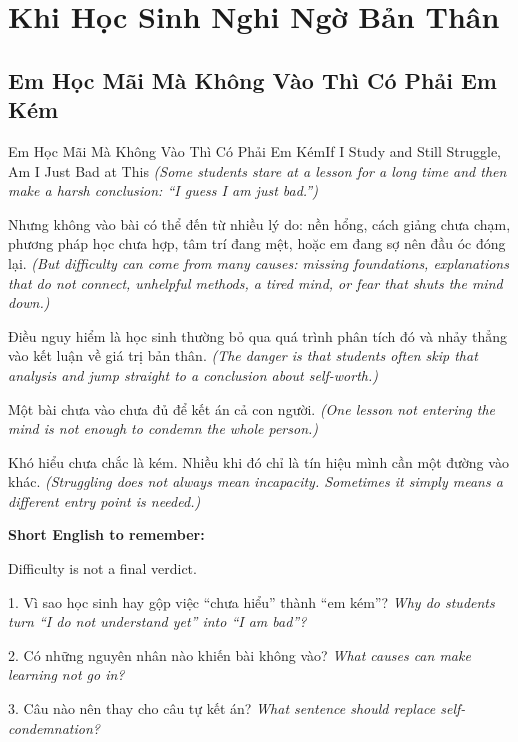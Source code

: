 \chapter{Khi Học Sinh Nghi Ngờ Bản Thân}

\section{Em Học Mãi Mà Không Vào Thì Có Phải Em Kém}
\begin{truyen}{Em Học Mãi Mà Không Vào Thì Có Phải Em Kém}{If I Study and Still Struggle, Am I Just Bad at This}
\textit{(Some students stare at a lesson for a long time and then make a harsh conclusion: “I guess I am just bad.”)}

Nhưng không vào bài có thể đến từ nhiều lý do: nền hổng, cách giảng chưa chạm, phương pháp học chưa hợp, tâm trí đang mệt, hoặc em đang sợ nên đầu óc đóng lại.
\textit{(But difficulty can come from many causes: missing foundations, explanations that do not connect, unhelpful methods, a tired mind, or fear that shuts the mind down.)}

Điều nguy hiểm là học sinh thường bỏ qua quá trình phân tích đó và nhảy thẳng vào kết luận về giá trị bản thân.
\textit{(The danger is that students often skip that analysis and jump straight to a conclusion about self-worth.)}

Một bài chưa vào chưa đủ để kết án cả con người.
\textit{(One lesson not entering the mind is not enough to condemn the whole person.)}
\end{truyen}

\begin{baihoc}
Khó hiểu chưa chắc là kém. Nhiều khi đó chỉ là tín hiệu mình cần một đường vào khác.
\textit{(Struggling does not always mean incapacity. Sometimes it simply means a different entry point is needed.)}
\end{baihoc}

\begin{ghinhoanh}
\textbf{Short English to remember:}

Difficulty is not a final verdict.

\end{ghinhoanh}

\begin{tuhocnhanh}
1. Vì sao học sinh hay gộp việc “chưa hiểu” thành “em kém”? \textit{Why do students turn “I do not understand yet” into “I am bad”?}

2. Có những nguyên nhân nào khiến bài không vào? \textit{What causes can make learning not go in?}

3. Câu nào nên thay cho câu tự kết án? \textit{What sentence should replace self-condemnation?}
\end{tuhocnhanh}
\ngancach

